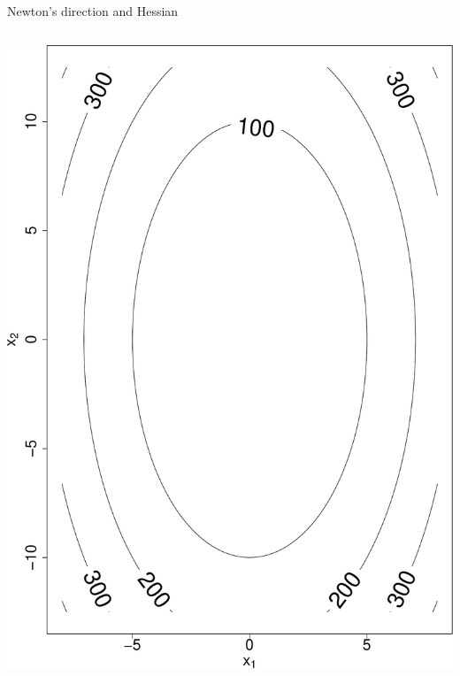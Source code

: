 \documentclass[ignorenonframetext,aspectratio=169]{beamer}
\begin{document}
\begin{frame}{Newton's direction and Hessian}
\begin{columns}
\begin{column}{0.3\textwidth}
\begin{center}\includegraphics[height=0.49\textheight]{lecture9_files/figure-beamer/unnamed-chunk-9-1} \end{center}
\end{column}
\end{columns}

\end{frame}
\end{document}
